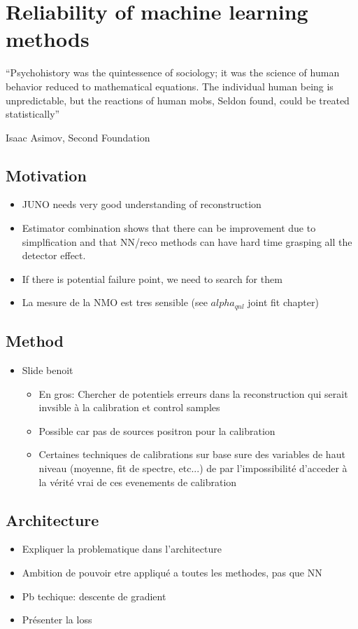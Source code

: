 \documentclass[../main.tex]{subfiles}
\begin{document}
\chapter{Reliability of machine learning methods}
\label{sec:janne}

\epigraph{``Psychohistory was the quintessence of sociology; it was the science of human behavior reduced to mathematical equations. The individual human being is unpredictable, but the reactions of human mobs, Seldon found, could be treated statistically''}{Isaac Asimov, Second Foundation }

\section{Motivation}
\label{sec:janne:motivation}
\begin{itemize}
  \item JUNO needs very good understanding of reconstruction
  \item Estimator combination shows that there can be improvement due to simplfication and that NN/reco methods can have hard time grasping all the detector effect.
  \item If there is potential failure point, we need to search for them
  \item La mesure de la NMO est tres sensible (see $alpha_{qnl}$ joint fit chapter)
\end{itemize}

\section{Method}
\label{sec:janne:method}
\begin{itemize}
  \item Slide benoit
    \begin{itemize}
      \item En gros: Chercher de potentiels erreurs dans la reconstruction qui serait invsible à la calibration et control samples
      \item Possible car pas de sources positron pour la calibration
      \item Certaines techniques de calibrations sur base sure des variables de haut niveau (moyenne, fit de spectre, etc...) de par l'impossibilité d'acceder à la vérité vrai de ces evenements de calibration
    \end{itemize}
\end{itemize}

\section{Architecture}
\label{sec:janne:arch}
\begin{itemize}
  \item Expliquer la problematique dans l'architecture
  \item Ambition de pouvoir etre appliqué a toutes les methodes, pas que NN
  \item Pb techique: descente de gradient
  \item Présenter la loss
\end{itemize}
\end{document}
